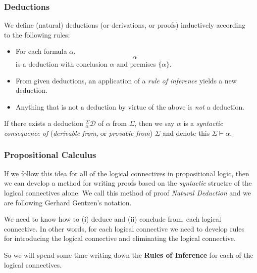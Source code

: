 \documentclass{beamer}
\begin{document}
\begin{frame}
	\frametitle{Deductions}
	
	We define (natural) deductions (or derivations, or proofs) inductively according to the following rules: 
	
	\begin{itemize}
		\item For each formula $\alpha$,
		$$ \alpha $$
		is a deduction with conclusion $\alpha$ and premises $\{\alpha\}$.
		
		\item From given deductions, an application of a \textit{rule of inference} yields a new deduction.
		
		\item Anything that is not a deduction by virtue of the above is \emph{not} a deduction. 
	\end{itemize}
	
	\vspace{3mm}

	If there exists a deduction $^\Sigma_{\alpha}\mathcal{D}$ of $\alpha$ from $\Sigma$, then we say $\alpha$ is a \textit{syntactic consequence of }(\textit{derivable from}, or \textit{provable from}) $\Sigma$ and denote this $\Sigma \vdash \alpha$. 
	
	
\end{frame}

\begin{frame}
	\frametitle{Propositional Calculus}
	
	If we follow this idea for all of the logical connectives in propositional logic, then we can develop a method for writing proofs based on the \textit{syntactic} structre of the logical connectives alone. We call this method of proof \emph{Natural Deduction} and we are following Gerhard Gentzen's notation.
	
	\vspace{0.3cm}
	
	We need to know how to (i) deduce and (ii) conclude from, each logical connective. In other words, for each logical connective we need to develop rules for introducing the logical connective and eliminating the logical connective.
	
	\vspace{0.3cm}
	
	So we will spend some time writing down the {\bf Rules of Inference} for each of the logical connectives. 
	
\end{frame}
\end{document}
